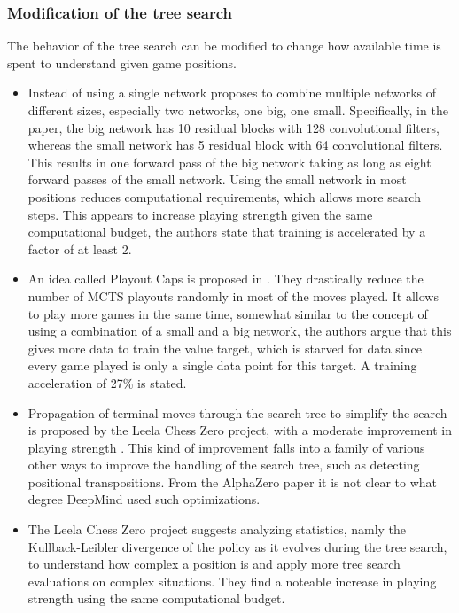 \documentclass[12pt,onecolumn,oneside,titlepage]{article}
\begin{document}
\subsubsection{Modification of the tree search}

The behavior of the tree search can be modified to change how available time is spent to understand given game positions.

\begin{itemize}
 \item Instead of using a single network \cite{lan2019multiple} proposes to combine multiple networks of different sizes, especially two networks, one big, one small. Specifically, in the paper, the 
 big network has 10 residual blocks with 128 convolutional filters, whereas the small network has 5 residual block with 64 convolutional filters. This results in one forward pass of the big network taking as long as eight forward passes of the small network.
 Using the small network in most positions reduces computational requirements, 
 which allows more search steps. This appears to increase playing strength given the same computational budget, the authors state that training is accelerated by a factor of at least 2.
 \item An idea called Playout Caps is proposed in \cite{wu2019accelerating}. They drastically reduce the number of MCTS playouts randomly in most of the moves played. It allows to play more games in the same time, somewhat similar to 
 the concept of using a combination of a small and a big network, the authors argue that this gives more data to train the value target, which is starved for data since every game played is only a single data point for this target. A training acceleration of 27\% is stated.
 \item Propagation of terminal moves through the search tree to simplify the search is proposed by the Leela Chess Zero project, with a moderate improvement in playing strength \cite{leela0propagation}. This kind of improvement falls
 into a family of various other ways to improve the handling of the search tree, such as detecting positional transpositions. From the AlphaZero paper it is not clear to what degree DeepMind used such optimizations.
 \item The Leela Chess Zero project suggests analyzing statistics, namly the Kullback-Leibler divergence of the policy as it evolves during the tree search, to understand how complex a position is and apply more tree search evaluations on complex situations. They find a noteable increase
   in playing strength \cite{leela0kldgain} using the same computational budget.
\end{itemize}
\end{document}
